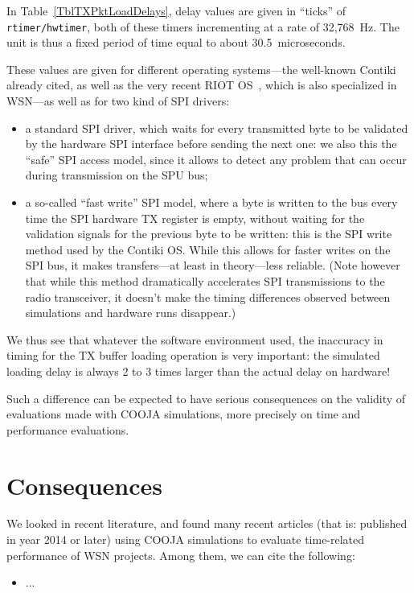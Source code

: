 \documentclass[a4paper,10pt]{article}
\begin{document}
In Table~\ref{TblTXPktLoadDelays}, delay values are given in ``ticks'' of
\texttt{rtimer/hwtimer}, both of these timers incrementing at a rate of
32,768~Hz. The unit is thus a fixed period of time equal to about
30.5~microseconds.

These values are given for different operating systems---the well-known
Contiki already cited, as well as the very recent RIOT OS~\cite{RIOT},
which is also specialized in WSN---as well as for two kind of SPI drivers:
\begin{itemize}
\item a standard SPI driver, which waits for every transmitted byte to be
validated by the hardware SPI interface before sending the next one:
we also this the ``safe'' SPI access model, since it allows to detect
any problem that can occur during transmission on the SPU bus;
\item a so-called ``fast write'' SPI model, where a byte is written to
the bus every time the SPI hardware TX register is empty, without waiting
for the validation signals for the previous byte to be written: this is
the SPI write method used by the Contiki OS. While this allows for faster
writes on the SPI bus, it makes transfers---at least in theory---less
reliable. (Note however that while this method dramatically accelerates
SPI transmissions to the radio transceiver, it doesn't make the timing
differences observed between simulations and hardware runs disappear.)
\end{itemize}

We thus see that whatever the software environment used, the inaccuracy
in timing for the TX buffer loading operation is very important:
the simulated loading delay is always 2 to 3 times larger than
the actual delay on hardware!

Such a difference can be expected to have serious consequences on
the validity of evaluations made with COOJA simulations, more precisely
on time and performance evaluations.


\section{Consequences}

We looked in recent literature, and found many recent articles (that is:
published in year 2014 or later) using COOJA simulations to evaluate
time-related performance of WSN projects. Among them, we can cite
the following:
\begin{itemize}
\item ...
\end{itemize}
\end{document}
